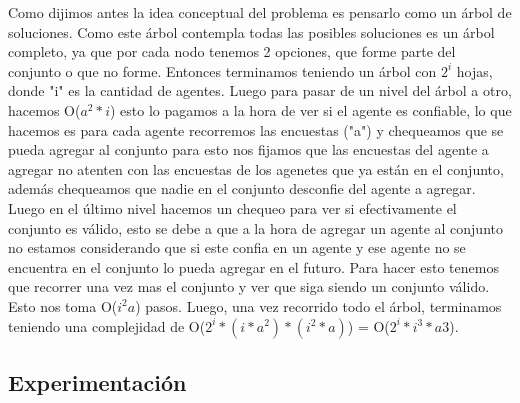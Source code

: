 	Como dijimos antes la idea conceptual del problema es pensarlo como un árbol de soluciones. Como este árbol contempla todas las posibles soluciones es un árbol completo, ya que por cada nodo tenemos 2 opciones, que forme parte del conjunto o que no forme. Entonces terminamos teniendo un árbol con $2^{i}$ hojas, donde "i" es la cantidad de agentes. Luego para pasar de un nivel del árbol a otro, hacemos O($a^{2}*i$) esto lo pagamos a la hora de ver si el agente es confiable, lo que hacemos es para cada agente recorremos las encuestas ("a") y chequeamos que se pueda agregar al conjunto para esto nos fijamos que las encuestas del agente a agregar no atenten con las encuestas de los agenetes que ya están en el conjunto, además chequeamos que nadie en el conjunto desconfie del agente a agregar. Luego en el último nivel hacemos un chequeo para ver si efectivamente el conjunto es válido, esto se debe a que a la hora de agregar un agente al conjunto no estamos considerando que si este confia en un agente y ese agente no se encuentra en el conjunto lo pueda agregar en el futuro. Para hacer esto tenemos que recorrer una vez mas el conjunto y ver que siga siendo un conjunto válido. Esto nos toma O($i^{2}a$) pasos. Luego, una vez recorrido todo el árbol, terminamos teniendo una complejidad de O($2^{i}*(i*a^{2})*(i^{2}*a)$) = O($2^{i}*i^{3}*a{3}$).
	
\subsection{Experimentación} 

